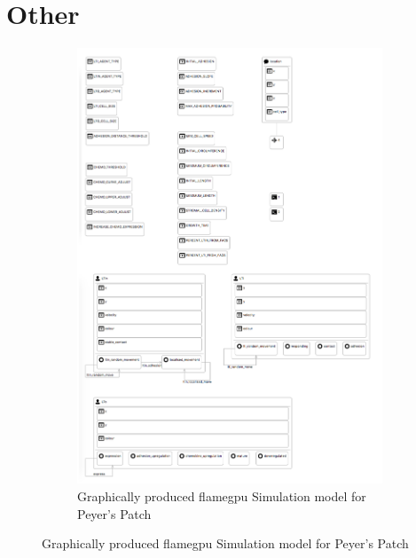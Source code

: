 \documentclass{UoYCSproject}
\begin{document}
\section{Other}

\begin{figure}[htp]
\centering
\begin{subfigure}{\textwidth}
\centering
\includegraphics[width=\textwidth]{Appendix/ppsim_gmf}
\caption{Graphically produced \acrshort{flamegpu} Simulation model for Peyer's Patch}
\label{fig:ppsim_gmf}
\end{subfigure}%
\end{figure}
\end{document}
